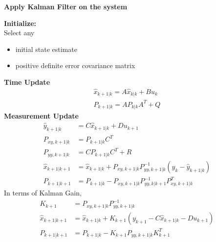 \documentclass[12pt,a4paper]{article}
\begin{document}
	\begin{center}
		\textbf{Apply Kalman Filter on the system}
	\end{center}
	\textbf{Initialize:}\\
	Select any
	\begin{itemize}
		\item { initial state estimate}
		\item { positive definite error covariance matrix}
	\end{itemize}
	\textbf{Time Update} \\
	\begin{equation}
		\begin{split}
			\hat{x}_{k+1|k} = A\hat{x}_{k|k} + Bu_k \\
			P_{k+1|k} = AP_{k|k}A^T + Q
		\end{split}
		\label{eq2}
	\end{equation}
	\textbf{Measurement Update} \\
	\begin{equation}
		\begin{split}
			\hat{y}_{k+1|k} &= C\hat{x}_{k+1|k} + Du_{k+1} \\
			P_{xy,k+1|k} &= P_{k+1|k}C^T  \\
			P_{yy,k+1|k} &= CP_{k+1|k}C^T + R \\
			\hat{x}_{k+1|k+1} &= \hat{x}_{k+1|k} + P_{xy,k+1|k}P^{-1}_{yy,k+1|k}(y_k - \hat{y}_{k+1|k}) \\
			P_{k+1|k+1} &= P_{k+1|k} - P_{xy,k+1|k}P^{-1}_{yy,k|k+1}P^T_{xy,k+1|k}
		\end{split}
		\label{eq3}
	\end{equation}
	In terms of Kalman Gain,
	\begin{equation}
		\begin{split}
			K_{k+1} &= P_{xy,k+1|k}P^{-1}_{yy,k+1|k}\\
			\hat{x}_{k+1|k+1} &= \hat{x}_{k+1|k} + K_{k+1}(y_{k+1} - C\hat{x}_{k+1|k} - Du_{k+1}) \\
			P_{k+1|k+1} &= P_{k+1|k} - K_{k+1} P_{yy,k+1|k}K^T_{k+1}
		\end{split}
		\label{eq4}
	\end{equation}
\end{document}
